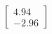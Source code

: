 \documentclass[preview]{standalone}
\begin{document}
\begin{align*}
\begin{bmatrix} 4.94 \\ -2.96 \end{bmatrix}
\end{align*}
\end{document}
